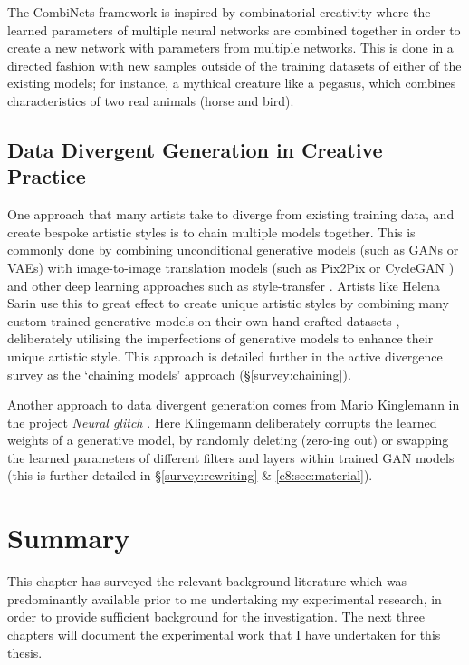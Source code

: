 The CombiNets framework \citep{guzdial2018combinets} is inspired by combinatorial creativity \citep{boden2004creative} where the learned parameters of multiple neural networks are combined together in order to create a new network with parameters from multiple networks.
This is done in a directed fashion with new samples outside of the training datasets of either of the existing models; for instance, a mythical creature like a pegasus, which combines characteristics of two real animals (horse and bird).

\subsection{Data Divergent Generation in Creative Practice}
\label{c2:subsec:divergent-practice}

One approach that many artists take to diverge from existing training data, and create bespoke artistic styles is to chain multiple models together. 
This is commonly done by combining unconditional generative models (such as GANs or VAEs) with image-to-image translation models (such as Pix2Pix \citep{isola2017image} or CycleGAN \citep{zhu2017unpaired}) and other deep learning approaches such as style-transfer \citep{gatys2016neural}.
Artists like Helena Sarin use this to great effect to create unique artistic styles by combining many custom-trained generative models on their own hand-crafted datasets \citep{sarin2018playing}, deliberately utilising the imperfections of generative models to enhance their unique artistic style. 
This approach is detailed further in the active divergence survey as the `chaining models' approach (\S \ref{survey:chaining}).

Another approach to data divergent generation comes from Mario Kinglemann in the project \textit{Neural glitch} \citep{klingemann2018neural}. 
Here Klingemann deliberately corrupts the learned weights of a generative model, by randomly deleting (zero-ing out) or swapping the learned parameters of different filters and layers within trained GAN models (this is further detailed in \S \ref{survey:rewriting} \& \ref{c8:sec:material}). 

\section{Summary}

This chapter has surveyed the relevant background literature which was predominantly available prior to me undertaking my experimental research, in order to provide sufficient background for the investigation.
The next three chapters will document the experimental work that I have undertaken for this thesis.

